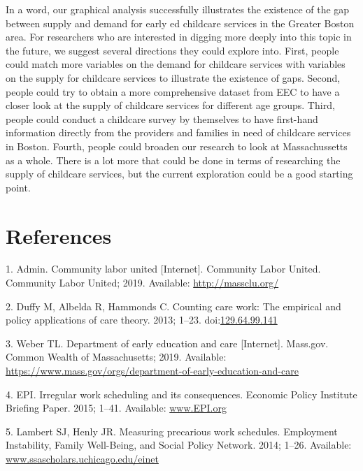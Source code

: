 \documentclass[10pt,letterpaper]{article}
\begin{document}
In a word, our graphical analysis successfully illustrates the existence
of the gap between supply and demand for early ed childcare services in
the Greater Boston area. For researchers who are interested in digging
more deeply into this topic in the future, we suggest several directions
they could explore into. First, people could match more variables on the
demand for childcare services with variables on the supply for childcare
services to illustrate the existence of gaps. Second, people could try
to obtain a more comprehensive dataset from EEC to have a closer look at
the supply of childcare services for different age groups. Third, people
could conduct a childcare survey by themselves to have first-hand
information directly from the providers and families in need of
childcare services in Boston. Fourth, people could broaden our research
to look at Massachussetts as a whole. There is a lot more that could be
done in terms of researching the supply of childcare services, but the
current exploration could be a good starting point.

\section*{References}\label{references.unumbered}

\hypertarget{refs}{}
\hypertarget{ref-CLU}{}
1. Admin. Community labor united {[}Internet{]}. Community Labor United.
Community Labor United; 2019. Available: \url{http://massclu.org/}

\hypertarget{ref-duffy_albelda_hammonds_2013}{}
2. Duffy M, Albelda R, Hammonds C. Counting care work: The empirical and
policy applications of care theory. 2013; 1--23.
doi:\href{https://doi.org/129.64.99.141}{129.64.99.141}

\hypertarget{ref-EEC}{}
3. Weber TL. Department of early education and care {[}Internet{]}.
Mass.gov. Common Wealth of Massachusetts; 2019. Available:
\url{https://www.mass.gov/orgs/department-of-early-education-and-care}

\hypertarget{ref-epi_2015}{}
4. EPI. Irregular work scheduling and its consequences. Economic Policy
Institute Briefing Paper. 2015; 1--41. Available: \url{www.EPI.org}

\hypertarget{ref-lambert_henly_2014}{}
5. Lambert SJ, Henly JR. Measuring precarious work schedules. Employment
Instability, Family Well-Being, and Social Policy Network. 2014; 1--26.
Available: \url{www.ssascholars.uchicago.edu/einet}
\end{document}
